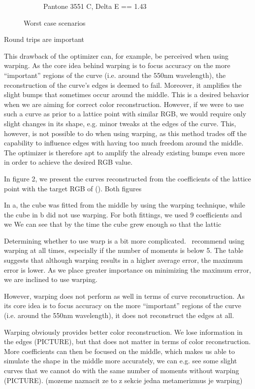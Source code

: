 \begin{figure}[t]
\begin{subfigure}[t]{0.49\textwidth}
		\caption{ Pantone 3551 C, Delta E == 1.43}
		\label{fig:resultWorstNonWarp}
	\end{subfigure}
	\caption{Worst case scenarios}
	\label{fig:resultsTechniquesWorst}
\end{figure}


Round trips are important 

This drawback of the optimizer can, for example, be perceived when using warping. As the core idea behind warping is to focus accuracy on the more ``important'' regions of the curve (i.e. around the 550nm wavelength), the reconstruction of the curve's edges is deemed to fail. Moreover, it amplifies the slight bumps that sometimes occur around the middle. This is a desired behavior when we are aiming for correct color reconstruction. However, if we were to use such a curve as prior to a lattice point with similar RGB, we would require only slight changes in its shape, e.g. minor tweaks at the edges of the curve. This, however, is not possible to do when using warping, as this method trades off the capability to influence edges with having too much freedom around the middle. The optimizer is therefore apt to amplify the already existing bumps even more in order to achieve the desired RGB value.

In figure 2, we present the curves reconstructed from the coefficients of the lattice point with the target RGB of (). Both figures 

In a, the cube was fitted from the middle by using the warping technique, while the cube in b did not use warping. For both fittings, we used 9 coefficients and we  We can see that by the time the cube grew enough so that the lattic



 Determining whether to use warp is a bit more complicated.~\citet{trigonometricMomentsPaper} recommend using warping at all times, especially if the number of moments is below 5. The table suggests that although warping results in a higher average error, the maximum error is lower. As we place greater importance on minimizing the maximum error, we are inclined to use warping.

However, warping does not perform as well in terms of curve reconstruction. As its core idea is to focus accuracy on the more ``important'' regions of the curve (i.e. around the 550nm wavelength), it does not reconstruct the edges at all. 




Warping obviously provides better color reconstruction. We lose information in the edges (PICTURE), but that does not matter in terms of color reconstruction. More coefficients can then be focused on the middle, which makes us able to simulate the shape in the middle more accurately, we can e.g. see some slight curves that we cannot do with the same number of moments without warping (PICTURE). (mozeme naznacit ze to z sekcie jedna metamerizmus je warping)

